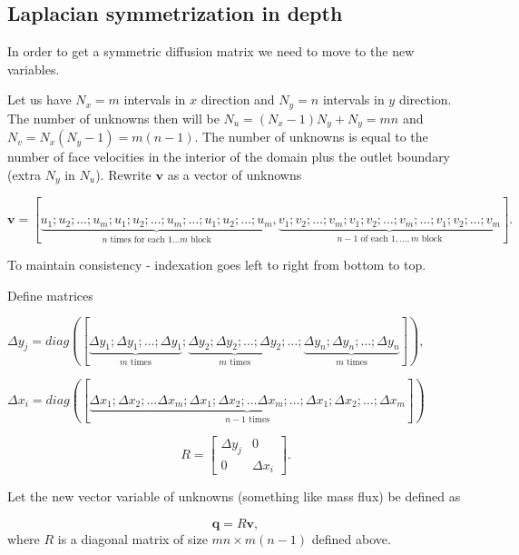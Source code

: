\documentclass{article}
\begin{document}


\subsection{Laplacian symmetrization in depth}\label{appendix:symmetric-laplacian}

In order to get a symmetric diffusion matrix we need to move to the new variables. 

Let us have $N_x=m$ intervals in $x$ direction and $N_y=n$ intervals in $y$ direction. The number of unknowns then will be $N_u=(N_x-1)N_y+N_y=mn$ and $N_v=N_x(N_y-1)=m(n-1)$. The number of unknowns is equal to the number of face velocities in the interior of the domain plus the outlet boundary (extra $N_y$ in $N_u$). Rewrite $\boldsymbol{v}$ as a vector of unknowns

$$\boldsymbol{v} = [\underbrace{u_1;u_2;\dotsc;u_{m};u_1;u_2;\dotsc;u_{m};\dotsc;u_1;u_2;\dotsc;u_{m}}_{n\text{ times for each }1...m\text{ block}}, \underbrace{v_1;v_2;\dotsc;v_{m};v_1;v_2;\dotsc;v_{m};\dotsc;v_1;v_2;\dotsc;v_{m}}_{n-1 \text{ of each }1,\dotsc,m\text{ block}}].$$

To maintain consistency - indexation goes left to right from bottom to top.

Define matrices 

$\Delta y_j=diag([\underbrace{\Delta y_1; \Delta y_1; \dotsc;\Delta y_1}_{m\text{ times}}; \underbrace{\Delta y_2; \Delta y_2; \dotsc;\Delta y_2}_{m\text{ times}};\dotsc;\underbrace{\Delta y_n; \Delta y_n; \dotsc;\Delta y_n}_{m\text{ times}}]),$

$ \Delta x_i=diag([\underbrace{\Delta x_1; \Delta x_2;\dotsc\Delta x_m;\Delta x_1; \Delta x_2;\dotsc\Delta x_m; \dotsc;\Delta x_1; \Delta x_2;\dotsc;\Delta x_m}_{n-1\text{ times}}])$

\begin{equation*}
R =\left[\begin{array}{cc}
\Delta y_j & 0 \\
0 & \Delta x_i
\end{array}\right].
\end{equation*}

Let the new vector variable of unknowns (something like mass flux) be defined as

$$\boldsymbol{q} = R\boldsymbol{v},$$ 
where $R$ is a diagonal matrix of size $mn\times m(n-1)$ defined above. 
\end{document}
